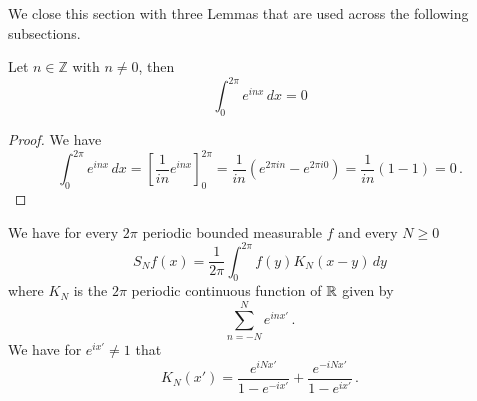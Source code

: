 We close this section with three Lemmas that are used
across the following subsections.

\begin{lemma}\label{lem expintegral}
Let $n\in \mathbb{Z}$ with   $n\neq 0$, then
\begin{equation}
\int_0^{2\pi} e^{inx}\, dx=0
\end{equation}
\end{lemma}
\begin{proof}
We have
\begin{equation}
\int_0^{2\pi} e^{inx}\, dx=\left[ \frac 1{in}e^{inx}\right]_0^{2\pi}=\frac  1{in}(e^{2\pi i n}-e^{2\pi i 0})=\frac 1{in}(1-1)=0\, .
\end{equation}

\end{proof}

\begin{lemma}\label{dirichlet}
We have for every $2\pi$ periodic bounded measurable $f$ and every $N\ge 0$
\begin{equation}
    S_Nf(x)=\frac 1{2\pi}\int_{0}^{2\pi}f(y) K_N(x-y)\, dy
\end{equation}
where $K_N$ is the $2\pi$ periodic continuous function of
$\mathbb{R}$ given by
\begin{equation}\label{eqksumexp}
\sum_{n=-N}^N e^{in x'}\, .
\end{equation}
We have for $e^{ix'}\neq 1$ that
\begin{equation}\label{eqksumhil}
    K_N(x')=\frac{e^{iNx'}}{1-e^{-ix'}}
        +\frac {e^{-iNx'}}{1-e^{ix'}} \, .
\end{equation}


\end{lemma}


